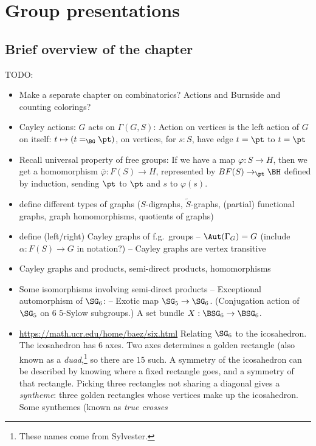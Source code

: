 \chapter{Group presentations}
\label{ch:fggroups}

\section{Brief overview of the chapter}
\label{sec:fggroups-overview}

TODO:
\begin{itemize}
\item Make a separate chapter on combinatorics? Actions and Burnside and counting colorings?
\item Cayley actions: $G$ acts on $\Gamma(G,S)$: Action on vertices is the left action of $G$ on itself: $t \mapsto (t=_{\BG} \pt)$, on vertices, for $s : S$, have edge $t = \pt$ to $t = \pt$
\item Recall universal property of free groups: If we have a map $\varphi : S \to H$, then we get a homomorphism $\bar\varphi : F(S) \to H$, represented by $BF(S) \to_\pt \BH$ defined by induction, sending $\pt$ to $\pt$ and $s$ to $\varphi(s)$.
\item define different types of graphs ($S$-digraphs, $\tilde S$-graphs,
  (partial) functional graphs, graph homomorphisms, quotients of graphs)
\item define (left/right) Cayley graphs of f.g.~groups
  -- $\Aut(\Gamma_G) = G$ (include $\alpha : F(S) \to G$ in notation?)
  -- Cayley graphs are vertex transitive
\item Cayley graphs and products, semi-direct products, homomorphisms
\item Some isomorphisms involving semi-direct products
  -- Exceptional automorphism of $\SG_6$:
  -- Exotic map $\SG_5 \to \SG_6$.
  (Conjugation action of $\SG_5$ on $6$ $5$-Sylow subgroups.)
  A set bundle $X : \BSG_6 \to \BSG_6$.
\item \url{https://math.ucr.edu/home/baez/six.html}
  Relating $\SG_6$ to the icosahedron.
  The icosahedron has $6$ axes. Two axes determines a golden rectangle (also known as a \emph{duad},\footnote{%
    These names come from Sylvester.}
  so there are $15$ such. A symmetry of the icosahedron can be described
  by knowing where a fixed rectangle goes, and a symmetry of that rectangle.
  Picking three rectangles not sharing a diagonal gives a \emph{syntheme}:
  three golden rectangles whose vertices make up the icosahedron.
  Some synthemes (known as \emph{true crosses}

\end{itemize}
